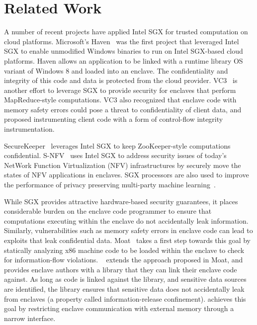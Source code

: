 \section{Related Work}
\label{section:related}

 A number of recent projects have applied Intel
SGX for trusted computation on cloud platforms. Microsoft's
Haven~\citep{haven:tocs15} was the first project that leveraged Intel SGX to
enable unmodified Windows binaries to run on Intel SGX-based cloud platforms.
Haven allows an application to be linked with a runtime library OS variant of
Windows 8 and loaded into an enclave. The confidentiality and integrity of this
code and data is protected from the cloud provider.  VC3~\cite{vc3:oak15} is
another effort to leverage SGX to provide security for enclaves that perform
MapReduce-style computations.  VC3 also recognized that enclave code with
memory safety errors could pose a threat to confidentiality of client data, and
proposed instrumenting client code with a form of control-flow integrity
instrumentation. 

SecureKeeper~\cite{securekeeper:middleware16} leverages Intel SGX to keep
ZooKeeper-style computations confidential. S-NFV~\cite{snfv:sdn16} uses Intel
SGX to address security issues of today's NetWork Function Virtualization (NFV)
infrastructures by securely move the states of NFV applications in enclaves. SGX
processors are also used to improve the performance of privacy preserving
multi-party machine learning~\cite{machinelearningsgx:usenixsec16}.  

While SGX provides attractive hardware-based security guarantees, it places
considerable burden on the enclave code programmer to ensure that computations
executing within the enclave do not accidentally leak information.  Similarly,
vulnerabilities such as memory safety errors in enclave code can lead to
exploits that leak confidential data.  Moat~\cite{moat:ccs15} takes a first
step towards this goal by statically analyzing x86 machine code to be loaded
within the enclave to check for information-flow violations.
~\cite{moatplus:pldi16} extends the approach proposed in
Moat, and provides enclave authors with a library that they can link their
enclave code against. As long as code is linked against the
 library, and sensitive data sources are identified, the
library ensures that sensitive data does not accidentally leak from enclaves
(a property called information-release confinement).
 achieves this goal by restricting enclave communication
with external memory through a narrow interface. 

